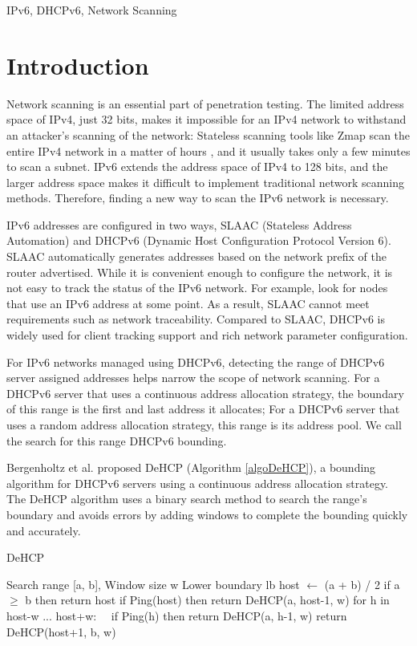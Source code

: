 \documentclass[conference]{IEEEtran}
\begin{document}
\begin{IEEEkeywords}
  IPv6, DHCPv6, Network Scanning
\end{IEEEkeywords}

\section{Introduction}

Network scanning is an essential part of penetration testing. The
limited address space of IPv4, just 32 bits, makes it impossible for
an IPv4 network to withstand an attacker's scanning of the network:
Stateless scanning tools like Zmap scan the entire IPv4 network in a
matter of hours \cite{adrian_zippier_nodate}, and it usually takes
only a few minutes to scan a subnet. IPv6 extends the address space of
IPv4 to 128 bits, and the larger address space makes it difficult to
implement traditional network scanning methods. Therefore, finding a
new way to scan the IPv6 network is necessary.

IPv6 addresses are configured in two ways, SLAAC (Stateless Address
Automation) and DHCPv6 (Dynamic Host Configuration Protocol Version
6). SLAAC automatically generates addresses based on the network
prefix of the router advertised. While it is convenient enough to
configure the network, it is not easy to track the status of the IPv6
network. For example, look for nodes that use an IPv6 address at some
point. As a result, SLAAC cannot meet requirements such as network
traceability. Compared to SLAAC, DHCPv6 is widely used for client
tracking support and rich network parameter configuration.

For IPv6 networks managed using DHCPv6, detecting the range of DHCPv6
server assigned addresses helps narrow the scope of network
scanning. For a DHCPv6 server that uses a continuous address
allocation strategy, the boundary of this range is the first and last
address it allocates; For a DHCPv6 server that uses a random address
allocation strategy, this range is its address pool. We call the
search for this range DHCPv6 bounding.

Bergenholtz et al. \cite{bergenholtz_finding_2019} proposed DeHCP
(Algorithm \ref{algoDeHCP}), a bounding algorithm for DHCPv6 servers
using a continuous address allocation strategy. The DeHCP algorithm
uses a binary search method to search the range's boundary and avoids
errors by adding windows to complete the bounding quickly and
accurately.

\begin{algorithm}[H]
  \caption{DeHCP}
  \label{algoDeHCP}
  \renewcommand{\algorithmicrequire}{\textbf{Input:}}
  \renewcommand{\algorithmicensure}{\textbf{Output:}}
  \begin{algorithmic}[1]
    \REQUIRE Search range [a, b], Window size w
    \ENSURE Lower boundary lb
    \STATE host $\gets$ (a + b) / 2
    \STATE if a $\ge$ b then return host
    \STATE if Ping(host) then return DeHCP(a, host-1, w)
    \STATE for h in host-w ... host+w:
    \STATE \ \ if Ping(h) then return DeHCP(a, h-1, w)
    \STATE return DeHCP(host+1, b, w)
  \end{algorithmic}
\end{algorithm}
\end{document}
